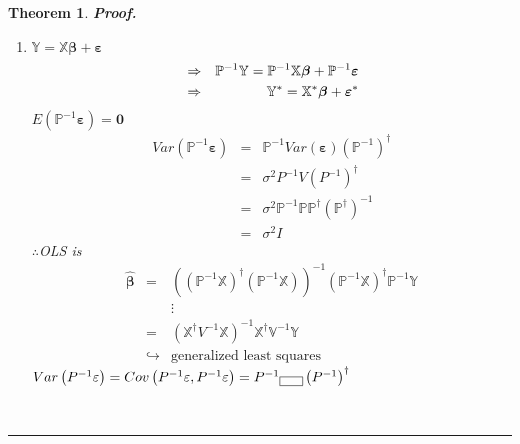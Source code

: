 \documentclass{article}
\newtheorem{theorem}{Theorem}
\newenvironment{proof}[1][Proof]{\noindent\textbf{#1.} }{\ \rule{0.5em}{0.5em}}
\begin{document}
\begin{theorem}
\begin{proof}
\begin{enumerate}
\item $\mathbb{Y}=\mathbb{X}\boldsymbol{\beta }+\boldsymbol{\varepsilon }$%
\begin{eqnarray*}
&\Rightarrow &\mathbb{P}^{-1}\mathbb{Y}=\mathbb{P}^{-1}\mathbb{X}\boldsymbol{%
\beta }+\mathbb{P}^{-1}\boldsymbol{\varepsilon } \\
&\Rightarrow &\mathbb{Y}^{\ast }=\mathbb{X}^{\ast }\boldsymbol{\beta }+%
\boldsymbol{\varepsilon }^{\ast }
\end{eqnarray*}%
$E\left( \mathbb{P}^{-1}\boldsymbol{\varepsilon }\right) =\boldsymbol{0}$%
\newline
\begin{eqnarray*}
Var\left( \mathbb{P}^{-1}\boldsymbol{\varepsilon }\right) &=&\mathbb{P}%
^{-1}Var\left( \boldsymbol{\varepsilon }\right) \left( \mathbb{P}%
^{-1}\right) ^{\dagger } \\
&=&\sigma ^{2}P^{-1}V\left( P^{-1}\right) ^{\dagger } \\
&=&\sigma ^{2}\mathbb{P}^{-1}\mathbb{PP}^{\dagger }\left( \mathbb{P}%
^{\dagger }\right) ^{-1} \\
&=&\sigma ^{2}I
\end{eqnarray*}%
$\therefore $OLS is%
\begin{eqnarray*}
\boldsymbol{\hat{\beta}} &\boldsymbol{=}&\left( \left( \mathbb{P}^{-1}%
\mathbb{X}\right) ^{\dagger }\left( \mathbb{P}^{-1}\mathbb{X}\right) \right)
^{-1}\left( \mathbb{P}^{-1}\mathbb{X}\right) ^{\dagger }\mathbb{P}^{-1}%
\mathbb{Y} \\
&&\vdots \\
&=&\left( \mathbb{X}^{\dagger }V^{-1}\mathbb{X}\right) ^{-1}\mathbb{X}%
^{\dagger }\mathbb{V}^{-1}\mathbb{Y} \\
&\hookrightarrow &\text{generalized least squares}
\end{eqnarray*}%
\newline
\newline
$Var\left( P^{-1}\varepsilon \right) =Cov\left( P^{-1}\varepsilon
,P^{-1}\varepsilon \right) =P^{-1}\fbox{$\quad $}\left( P^{-1}\right)
^{\dagger }$


\end{enumerate}
\end{proof}
\end{theorem}
\end{document}
